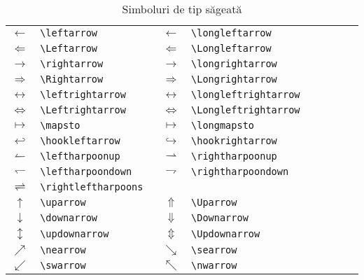 \documentclass{article}
\begin{document}
\begin{table}
\begin{tabular}{clclclcl}
$\leftarrow$     &\verb|\leftarrow         |&$\longleftarrow$     &\verb|\longleftarrow   |\\
$\Leftarrow$     &\verb|\Leftarrow         |&$\Longleftarrow$     &\verb|\Longleftarrow    |\\
$\rightarrow$    &\verb|\rightarrow        |&$\longrightarrow$    &\verb|\longrightarrow  |\\
$\Rightarrow$    &\verb|\Rightarrow        |&$\Longrightarrow$    &\verb|\Longrightarrow  |\\
$\leftrightarrow$&\verb|\leftrightarrow    |&$\longleftrightarrow$&\verb|\longleftrightarrow  |\\
$\Leftrightarrow$&\verb|\Leftrightarrow    |&$\Longleftrightarrow$&\verb|\Longleftrightarrow    |\\
$\mapsto$        &\verb|\mapsto            |&$\longmapsto$        &\verb|\longmapsto  |\\
$\hookleftarrow$ &\verb|\hookleftarrow     |&$\hookrightarrow$    &\verb|\hookrightarrow  |\\
$\leftharpoonup$ &\verb|\leftharpoonup     |&$\rightharpoonup     $&\verb|\rightharpoonup  |\\
$\leftharpoondown$&\verb|\leftharpoondown  |&$\rightharpoondown$  &\verb|\rightharpoondown   |\\
$\rightleftharpoons$&\verb|\rightleftharpoons    |\\
$\uparrow$        &\verb|\uparrow|&$\Uparrow$  &\verb|\Uparrow|\\
$\downarrow$&\verb|\downarrow|&$\Downarrow$   &\verb|\Downarrow   |\\
$\updownarrow$  &\verb|\updownarrow  |&$\Updownarrow$&\verb|\Updownarrow|\\
$\nearrow$         &\verb|\nearrow|&$\searrow$&\verb|\searrow|\\
$\swarrow$&\verb|\swarrow|&$\nwarrow$&\verb|\nwarrow|\\
\end{tabular}
\caption{Simboluri de tip s\u ageat\u a}
\end{table}
\par
\end{document}
